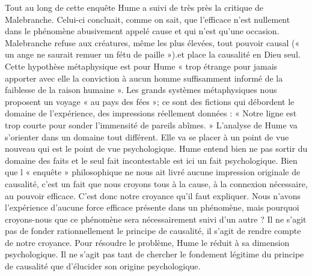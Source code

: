 Tout au long de cette enquête Hume a suivi de très
près la critique de Malebranche. Celui-ci concluait, comme
on sait, que l’efficace n’est nullement dans le phénomène
abusivement appelé cause et qui n’est qu’une occasion.
Malebranche refuse aux créatures, même les plus élevées,
tout pouvoir causal (« un ange ne saurait remuer un
fétu de paille »).et place la causalité en Dieu seul. Cette
hypothèse métaphysique est pour Hume « trop étrange
pour jamais apporter avec elle la conviction à aucun
homme suffisamment informé de la faiblesse de la raison
humaine ». Les grands systèmes métaphysiques nous
proposent un voyage « au pays des fées »; ce sont des
fictions qui débordent le domaine de l’expérience, des
impressions réellement données : « Notre ligne est trop
courte pour sonder l’immensité de pareils abîmes. »
L'analyse de Hume va s’orienter dans un domaine tout
différent. Elle va se placer à un point de vue nouveau qui
est le point de vue psychologique. Hume entend bien ne
pas sortir du domaine des faits et le seul fait incontestable
est ici un fait psychologique. Bien que l « enquête » philosophique 
ne nous ait livré aucune impression originale
de causalité, c’est un fait que nous croyons tous à la cause,
à la connexion nécessaire, au pouvoir efficace. C’est donc
notre croyance qu’il faut expliquer. Nous n’avons l’expérience 
d’aucune force efficace présente dans un phénomène,
mais pourquoi croyons-nous que ce phénomène sera nécessairement 
suivi d’un autre ? Il ne s’agit pas de fonder
rationnellement le principe de causalité, il s’agit de rendre
compte de notre croyance. Pour résoudre le problème,
Hume le réduit à sa dimension psychologique. Il ne s’agit
pas tant de chercher le fondement légitime du principe
de causalité que d’élucider son origine psychologique.

